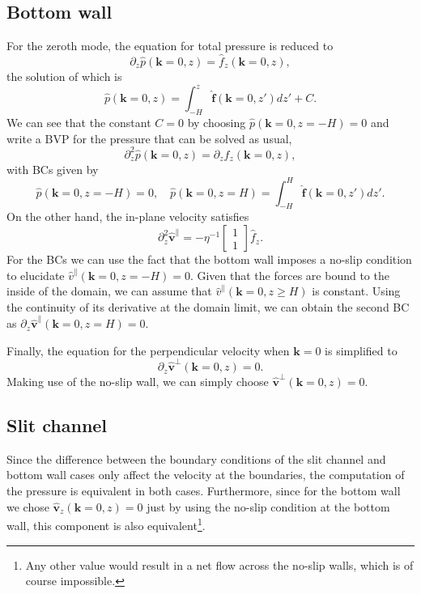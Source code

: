\documentclass[ twoside,openright,titlepage,numbers=noenddot,%
headinclude,footinclude,cleardoublepage=empty,abstract=on,
BCOR=5mm,paper=b5,fontsize=11pt, dvipsnames
]{scrreprt}
\renewcommand{\vec}[1]{\bm{#1}}
\newcommand{\fou}[1]{\widehat{#1}}
\newcommand{\fvel}{v}
\begin{document}
\subsection*{Bottom wall}
For the zeroth mode, the equation for total pressure is reduced to
\begin{equation}
  \label{eq:dppressurebtm}
  \partial_z\fou{p}(\vec{k}=0, z) = \fou{f}_z(\vec{k} = 0, z),
\end{equation}
the solution of which is
\begin{equation}
  \fou{p}(\vec{k}=0, z) = \int_{-H}^z\fou{\vec{f}}(\vec{k} = 0, z')dz' + C.
\end{equation}
We can see that the constant $C=0$ by choosing $\fou{p}(\vec{k} =0, z=-H) = 0$ and write a \gls{BVP} for the pressure that can be solved as usual,
\begin{equation}
  \partial_z^2\fou{p}(\vec{k} = 0, z) = \partial_zf_z(\vec{k}=0, z),
\end{equation}
with \glspl{BC} given by
\begin{equation}
  \fou{p}(\vec{k} = 0, z=-H) = 0, \quad \fou{p}(\vec{k} = 0, z=H) = \int_{-H}^H\fou{\vec{f}}(\vec{k} = 0, z')dz'.
\end{equation}
On the other hand, the in-plane velocity satisfies
\begin{equation}
  \partial_z^2\fou{\vec{\fvel}}^{\parallel} = -\eta^{-1}
  \begin{bmatrix}
    1\\
    1
  \end{bmatrix}
  \fou{f}_z.
\end{equation}
For the \glspl{BC} we can use the fact that the bottom wall imposes a no-slip condition to elucidate $\fou{\fvel}^\parallel(\vec{k} = 0, z=-H) = 0$. Given that the forces are bound to the inside of the domain, we can assume that $\fou{\fvel}^\parallel(\vec{k} = 0, z\ge H)$ is constant. Using the continuity of its derivative at the domain limit, we can obtain the second \gls{BC} as $\partial_z\fou{\vec{\fvel}}^\parallel(\vec{k} = 0, z=H) = 0$.

Finally, the equation for the perpendicular velocity when $\vec{k} = 0$ is simplified to
\begin{equation}
  \partial_z\fou{\vec{\fvel}}^\perp(\vec{k} = 0, z) = 0.
\end{equation}
Making use of the no-slip wall, we can simply choose $\fou{\vec{\fvel}}^\perp(\vec{k} = 0, z) = 0$.

\subsection*{Slit channel}
Since the difference between the boundary conditions of the slit channel and bottom wall cases only affect the velocity at the boundaries, the computation of the pressure is equivalent in both cases.
Furthermore, since for the bottom wall we chose $\fou{\vec{\fvel}}_z(\vec{k}=0, z) =0$ just by using the no-slip condition at the bottom wall, this component is also equivalent\footnote{Any other value would result in a net flow across the no-slip walls, which is of course impossible.}.
\end{document}
